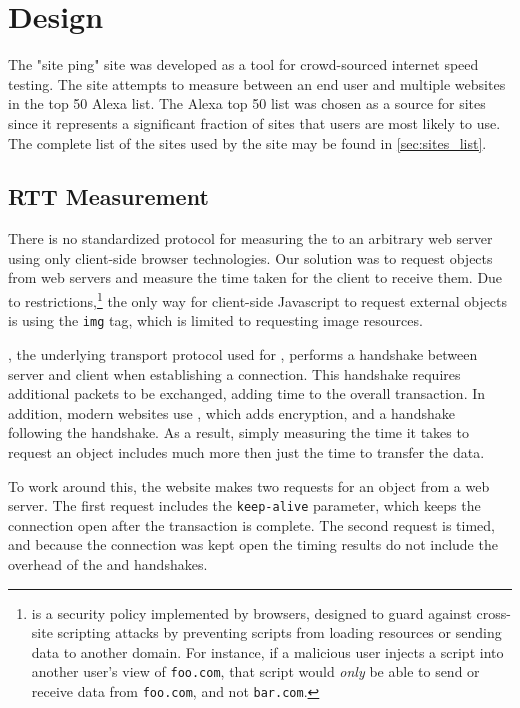 \section{Design}\label{sec:design_web_ping}
The "site ping" site was developed as a tool for crowd-sourced internet speed testing. The site attempts to measure \rtt between an end user and multiple websites in the top 50 Alexa list. The Alexa top 50 list was chosen as a source for sites since it represents a significant fraction of sites that users are most likely to use. The complete list of the sites used by the site may be found in \cref{sec:sites_list}.

\subsection{RTT Measurement}
There is no standardized protocol for measuring the \rtt to an arbitrary web server using only client-side browser technologies. Our solution was to request objects from web servers and measure the time taken for the client to receive them. Due to \cors restrictions,\footnote{\cors is a security policy implemented by browsers, designed to guard against cross-site scripting attacks by preventing scripts from loading resources or sending data to another domain. For instance, if a malicious user injects a script into another user's view of \texttt{foo.com}, that script would \textit{only} be able to send or receive data from \texttt{foo.com}, and not \texttt{bar.com}.} the only way for client-side Javascript to request external objects is using the \html \texttt{img} tag, which is limited to requesting image resources.

\TCP, the underlying transport protocol used for \http, performs a handshake between server and client when establishing a connection. This handshake requires additional packets to be exchanged, adding time to the overall transaction. In addition, modern websites use \httpse, which adds \tls encryption, and a \tls handshake following the \tcp handshake. As a result, simply measuring the time it takes to request an object includes much more then just the time to transfer the data.

To work around this, the website makes two requests for an object from a web server. The first request includes the \http \texttt{keep-alive} parameter, which keeps the \tcp connection open after the transaction is complete. The second request is timed, and because the connection was kept open the timing results do not include the overhead of the \tcp and \tls handshakes.

